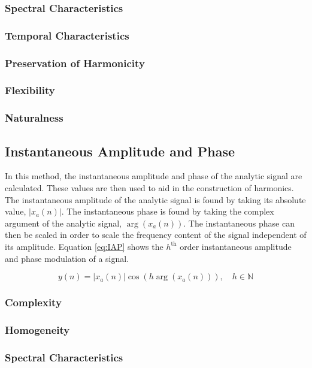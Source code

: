 		\subsubsection*{Spectral Characteristics}
		\subsubsection*{Temporal Characteristics}
		\subsubsection*{Preservation of Harmonicity}
		\subsubsection*{Flexibility}
		\subsubsection*{Naturalness}

	\subsection{Instantaneous Amplitude and Phase}
	\label{sec:Excitation-IAP}
		In this method, the instantaneous amplitude and phase of the analytic signal are calculated. These values
		are then used to aid in the construction of harmonics. The instantaneous amplitude of the analytic signal
		is found by taking its absolute value, $|x_{a}(n)|$. The instantaneous phase is found by taking the complex
		argument of the analytic signal, $\arg(x_{a}(n))$. The instantaneous phase can then be scaled in order to
		scale the frequency content of the signal independent of its amplitude. Equation \ref{eq:IAP} shows the
		$h^{\text{th}}$ order instantaneous amplitude and phase modulation of a signal.

		\begin{equation}
			y(n) = |x_{a}(n)| \cos \left( h\arg(x_{a}(n)) \right), \quad h \in \mathbb{N}
			\label{eq:IAP}
		\end{equation}

		\subsubsection*{Complexity}
		\subsubsection*{Homogeneity}
		\subsubsection*{Spectral Characteristics}

